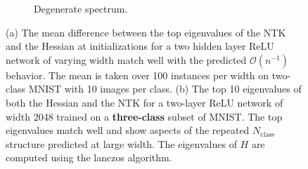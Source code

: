 \documentclass[english]{article}
\begin{document}
\begin{figure}
\begin{subfigure}[b]{0.46\textwidth}
         \caption{Degenerate spectrum.}
         \label{fig:repeatedspec}
     \end{subfigure}
     \caption{(a) The mean difference between the top eigenvalues of the NTK and the Hessian at initializations for a two hidden layer ReLU network of varying width match well with the predicted $\mathcal{O}(n^{-1})$ behavior. The mean is taken over 100 instances per width on two-class MNIST with 10 images per class. (b) The top 10 eigenvalues of both the Hessian and the NTK for a two-layer ReLU network of width 2048 trained on a \textbf{three-class} subset of MNIST. The top eigenvalues match well and show aspects of the repeated $N_{\textrm{class}}$ structure predicted at large width. The eigenvalues of $H$ are computed using the lanczos algorithm.} \label{fig:ev_diff}
 \end{figure}
 
\end{document}
